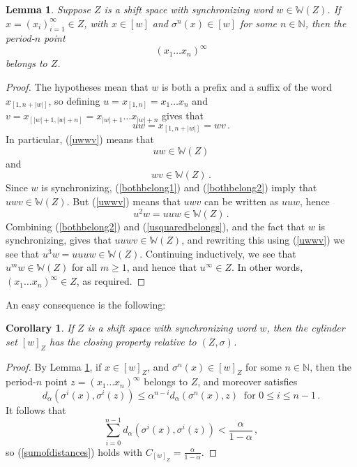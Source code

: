 \documentclass[reqno,11pt]{amsart}
\newtheorem{lem}[thm]{Lemma}
\newtheorem{cor}[thm]{Corollary}
\theoremstyle{definition}
\theoremstyle{remark}
\theoremstyle{remark}
\def \N {\mathbb N}
\def\w{\mathbb{W}}
\numberwithin{equation}{section}
\begin{document}
\begin{lem}\label{synchronizingwordperiodicpoint}
Suppose $Z$ is a shift space with synchronizing word $w\in\w(Z)$.
If $x=(x_i)_{i=1}^\infty\in Z$, with $x\in [w]$ and $\sigma^n(x)\in [w]$ for some $n\in\N$,
then the period-$n$ point
$$
 (x_1\ldots x_n)^\infty
$$
belongs to $Z$.
\end{lem}
\begin{proof}
The hypotheses mean that $w$ is both a prefix and a suffix of the word $x_{[1,n+|w|]}$, so
defining 
$u=x_{[1,n]}=x_1\ldots x_n$
and
$v=x_{[|w|+1,|w|+n]}=x_{|w|+1}\ldots x_{|w|+n}
$
gives that
\begin{equation}\label{uwwv}
uw = x_{[1,n+|w|]} = wv\,.
\end{equation}
In particular, (\ref{uwwv}) means that 
\begin{equation}\label{bothbelong1}
uw\in \w(Z) 
\end{equation}
and
\begin{equation}\label{bothbelong2}
wv\in\w(Z)\,.
\end{equation}
Since $w$ is synchronizing, (\ref{bothbelong1}) and  (\ref{bothbelong2}) 
imply that $uwv\in\w(Z)$.
But  (\ref{uwwv}) means that $uwv$ can be written as $uuw$, hence 
\begin{equation}\label{usquaredbelongs}
u^2w=uuw\in\w(Z)\,.
\end{equation}
Combining (\ref{bothbelong2}) and (\ref{usquaredbelongs}), and the fact that $w$ is synchronizing, gives that
$uuwv\in\w(Z)$, and rewriting this using (\ref{uwwv}) we see that $u^3w=uuuw\in\w(Z)$.
Continuing inductively, we see that $u^mw\in \w(Z)$ for all $m\ge1$, and hence that $u^\infty\in Z$.
In other words, $(x_1\ldots x_n)^\infty\in Z$, as required.
\end{proof}

An easy consequence is the following:


\begin{cor}\label{synchronizedclosingproperty}
If $Z$ is a shift space with synchronizing word $w$,
then the cylinder set $[w]_Z$ has the closing property relative to $(Z,\sigma)$.
\end{cor}
\begin{proof}
By Lemma \ref{synchronizingwordperiodicpoint},
if $x\in [w]_Z$, and $\sigma^n(x)\in [w]_Z$ for some $n\in\N$,
then the period-$n$ point
$
 z=(x_1\ldots x_n)^\infty
$
belongs to $Z$, and moreover satisfies
\begin{equation}
\label{shadowingshiftiteratescor}
d_\alpha(\sigma^i(x),\sigma^i(z)) \le \alpha^{n-i} d_\alpha(\sigma^n(x),z)\ \text{ for }0\le i\le n-1\,.
\end{equation}
It follows that
\begin{equation*}
\sum_{i=0}^{n-1} d_\alpha(\sigma^i(x),\sigma^i(z)) < \frac{\alpha}{1-\alpha}\,,
\end{equation*}
so (\ref{sumofdistances}) holds with $C_{[w]_Z}= \frac{\alpha}{1-\alpha}$.
\end{proof}
\end{document}
